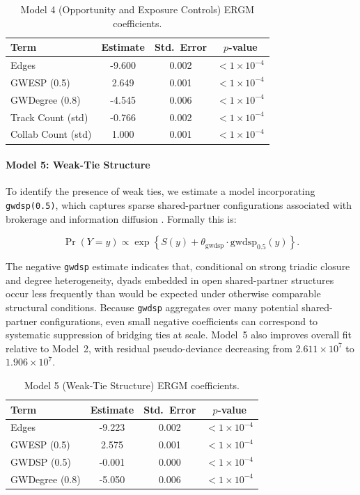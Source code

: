\documentclass[fleqn,10pt]{wlscirep}
\begin{document}
\begin{table}[h!]
\centering
\caption{Model 4 (Opportunity and Exposure Controls) ERGM coefficients.}
\footnotesize
\begin{tabular}{lccc}
\hline
Term & Estimate & Std.\ Error & $p$-value \\
\hline
Edges & -9.600 & 0.002 & $< 1 \times 10^{-4}$ \\
GWESP (0.5) &  2.649 & 0.001 & $< 1 \times 10^{-4}$ \\
GWDegree (0.8) & -4.545 & 0.006 & $< 1 \times 10^{-4}$ \\
Track Count (std) & -0.766 & 0.002 & $< 1 \times 10^{-4}$ \\
Collab Count (std) &  1.000 & 0.001 & $< 1 \times 10^{-4}$ \\
\hline
\end{tabular}
\label{tab:model4}
\end{table}

\paragraph*{Model 5: Weak-Tie Structure}
To identify the presence of weak ties, we estimate a model incorporating \texttt{gwdsp(0.5)}, which captures sparse shared-partner configurations associated with brokerage and information diffusion \cite{Granovetter1973WeakTies}. Formally this is:

\begin{equation}
\Pr(Y = y) \propto
\exp\left\{
    S(y)
    + \theta_{\text{gwdsp}} \cdot \text{gwdsp}_{0.5}(y)
\right\}.
\label{eq:model4-compact}
\end{equation}


The negative \texttt{gwdsp} estimate indicates that, conditional on strong triadic closure and degree heterogeneity, dyads embedded in open shared-partner structures occur less frequently than would be expected under otherwise comparable structural conditions. Because \texttt{gwdsp} aggregates over many potential shared-partner configurations, even small negative coefficients can correspond to systematic suppression of bridging ties at scale. Model~5 also improves overall fit relative to Model~2, with residual pseudo-deviance decreasing from $2.611\times 10^{7}$ to $1.906\times 10^{7}$.

\begin{table}[h!]
\centering
\caption{Model 5 (Weak-Tie Structure) ERGM coefficients.}
\footnotesize
\begin{tabular}{lccc}
\hline
Term & Estimate & Std.\ Error & $p$-value \\
\hline
Edges & -9.223 & 0.002 & $< 1 \times 10^{-4}$ \\
GWESP (0.5) &  2.575 & 0.001 & $< 1 \times 10^{-4}$ \\
GWDSP (0.5) & -0.001 & 0.000 & $< 1 \times 10^{-4}$ \\
GWDegree (0.8) & -5.050 & 0.006 & $< 1 \times 10^{-4}$ \\
\hline
\end{tabular}
\label{tab:model5}
\end{table}
\end{document}
